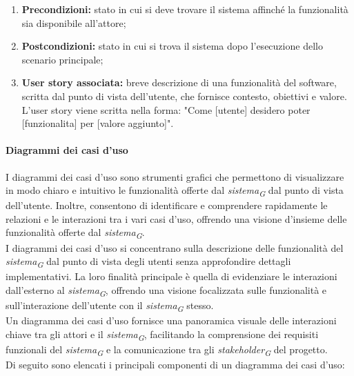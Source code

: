 \begin{enumerate}
    \item \textbf{Precondizioni:} stato in cui si deve trovare il sistema affinché la funzionalità sia disponibile all'attore;
    \item \textbf{Postcondizioni:} stato in cui si trova il sistema dopo l'esecuzione dello scenario principale;
    \item \textbf{User story associata:} breve descrizione di una funzionalità del software, scritta dal punto di vista dell'utente, che fornisce contesto, obiettivi e valore. \\
    L'user story viene scritta nella forma: "Come [utente] desidero poter [funzionalita] per [valore aggiunto]".
\end{enumerate}

\paragraph{Diagrammi dei casi d'uso} 
I diagrammi dei casi d'uso sono strumenti grafici che permettono di visualizzare in modo chiaro e intuitivo le funzionalità offerte dal \textit{sistema}\textsubscript{\textit{G}} dal punto di vista dell'utente. Inoltre, consentono di identificare e comprendere rapidamente le relazioni e le interazioni tra i vari casi d'uso, offrendo una visione d'insieme delle funzionalità offerte dal \textit{sistema}\textsubscript{\textit{G}}.\\
I diagrammi dei casi d'uso si concentrano sulla descrizione delle funzionalità del \textit{sistema}\textsubscript{\textit{G}} dal punto di vista degli utenti senza approfondire dettagli implementativi. La loro finalità principale è quella di evidenziare le interazioni dall'esterno al \textit{sistema}\textsubscript{\textit{G}}, offrendo una visione focalizzata sulle funzionalità e sull'interazione dell'utente con il \textit{sistema}\textsubscript{\textit{G}} stesso. \\
Un diagramma dei casi d'uso fornisce una panoramica visuale delle interazioni chiave tra gli attori e il \textit{sistema}\textsubscript{\textit{G}}, facilitando la comprensione dei requisiti funzionali del \textit{sistema}\textsubscript{\textit{G}} e la comunicazione tra gli \textit{stakeholder}\textsubscript{\textit{G}} del progetto. \\
Di seguito sono elencati i principali componenti di un diagramma dei casi d'uso:

